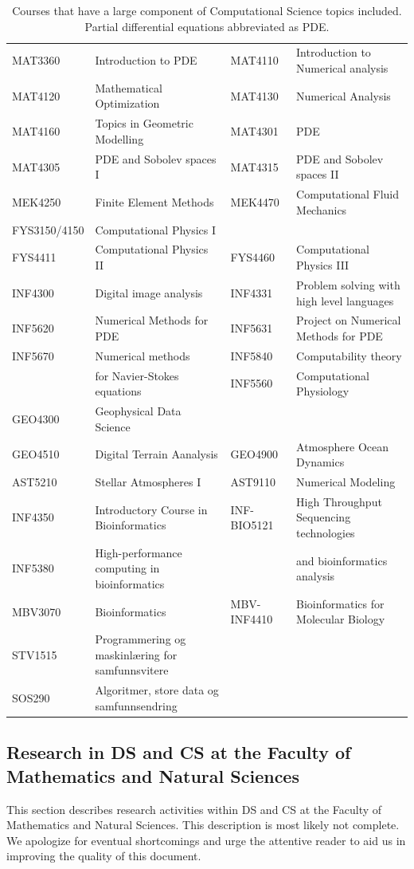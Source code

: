 \documentclass[a4paper,10pt]{article}
\begin{document}
\begin{table}[t]
    \centering
    \tiny
    \begin{tabular}{llll}
    \hline
MAT3360& Introduction to PDE&
MAT4110& Introduction to Numerical analysis\\
MAT4120& Mathematical Optimization&
MAT4130& Numerical Analysis\\
MAT4160& Topics in Geometric Modelling&
MAT4301& PDE\\
MAT4305& PDE and Sobolev spaces I&
MAT4315& PDE and Sobolev spaces II\\
MEK4250& Finite Element Methods &
MEK4470& Computational Fluid Mechanics\\
FYS3150/4150& Computational Physics I\\
FYS4411& Computational Physics II&
FYS4460& Computational Physics III\\
INF4300& Digital image analysis&
INF4331& Problem solving with high level languages\\
INF5620& Numerical Methods for PDE&
INF5631& Project on Numerical Methods for PDE\\
INF5670& Numerical methods&
INF5840& Computability theory\\
& for Navier-Stokes equations&INF5560& Computational Physiology\\
GEO4300& Geophysical Data Science\\
GEO4510& Digital Terrain Aanalysis&
GEO4900& Atmosphere Ocean Dynamics\\
AST5210& Stellar Atmospheres I&
AST9110& Numerical Modeling\\
INF4350& Introductory Course in Bioinformatics&
INF-BIO5121& High Throughput Sequencing technologies\\
INF5380& High-performance computing in bioinformatics&
& and bioinformatics analysis\\
MBV3070& Bioinformatics&
MBV-INF4410& Bioinformatics for Molecular Biology\\
STV1515& Programmering og maskinlæring for samfunnsvitere\\
SOS290& Algoritmer, store data og samfunnsendring\\

 \hline
\end{tabular}
\caption{Courses that have a large component of Computational Science topics included. Partial differential equations abbreviated as PDE.}
\label{tab:CScourses}
\end{table}

\newpage
\subsection{Research in DS and CS at the Faculty of Mathematics and Natural Sciences}
This section describes research activities within DS and CS at the Faculty of Mathematics and Natural Sciences. This description is most likely not complete. We apologize for eventual shortcomings and urge the attentive reader to aid us in improving the quality of this document. 
\end{document}
